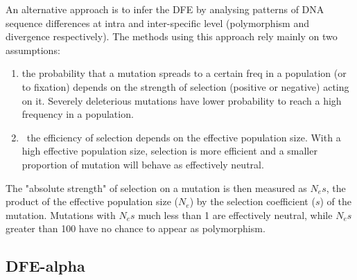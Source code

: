 An alternative approach is to infer the DFE by analysing patterns of DNA sequence differences at intra and inter-specific level (polymorphism and divergence respectively).
The methods using this approach rely mainly on two assumptions:
\begin{enumerate}
\item  the probability that a mutation spreads to a certain freq in a population (or to fixation) depends on the strength of selection (positive or negative) acting on it.
Severely deleterious mutations have lower probability to reach a high frequency in a population.
\item\ the efficiency of selection depends on the effective population size. 
With a high effective population size, selection is more efficient and a smaller proportion of mutation will behave as effectively neutral.
\end{enumerate}
%
The "absolute strength" of selection on a mutation is then measured as $N_{e}s$, the product of the effective population size ($N_{e}$)
by the selection coefficient ($s$)
of the mutation. Mutations with $N_{e}s$ much less than 1 are effectively neutral, while $N_{e}s$ greater than 100 have no chance to appear as polymorphism.

\subsection{DFE-alpha}

